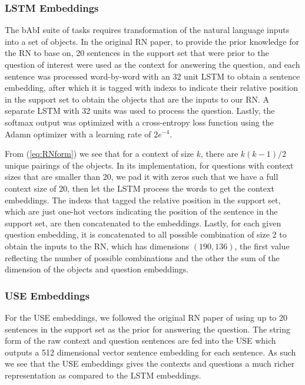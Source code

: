 \documentclass{article}
\begin{document}
\subsubsection{LSTM Embeddings}

The bAbI suite of tasks requires transformation of the natural language inputs into a set of objects. In the original RN paper, to provide the prior knowledge for the RN to base on, 20 sentences in the support set that were prior to the question of interest were used as the context for answering the question, and each sentence was processed word-by-word with an 32 unit LSTM to obtain a sentence embedding, after which it is tagged with indexs to indicate their relative position in the support set to obtain the objects that are the inputs to our RN. A separate LSTM with 32 units was used to process the question. Lastly, the softmax output was optimized with a cross-entropy loss function using the Adamn optimizer with a learning rate of $2e^{-4}$.

From (\ref{eq:RNform}) we see that for a context of size $k$, there are $k(k-1)/2$ unique pairings of the objects. In its implementation, for questions with context sizes that are smaller than 20, we pad it with zeros such that we have a full context size of 20, then let the LSTM process the words to get the context embeddings. The indexs that tagged the relative position in the support set, which are just one-hot vectors indicating the position of the sentence in the support set, are then concatenated to the embeddings. Lastly, for each given question embedding, it is concatenated to all possible combination of size 2 to obtain the inputs to the RN, which has dimensions $(190, 136)$, the first value reflecting the number of possible combinations and the other the sum of the dimension of the objects and question embeddings.




\subsubsection{USE Embeddings}

For the USE embeddings, we followed the original RN paper of using up to 20 sentences in the support set as the prior for answering the question. The string form of the raw context and question sentences are fed into the USE which outputs a 512 dimensional vector sentence embedding for each sentence. As such we see that the USE embeddings gives the contexts and questions a much richer representation as compared to the LSTM embeddings.
\end{document}
